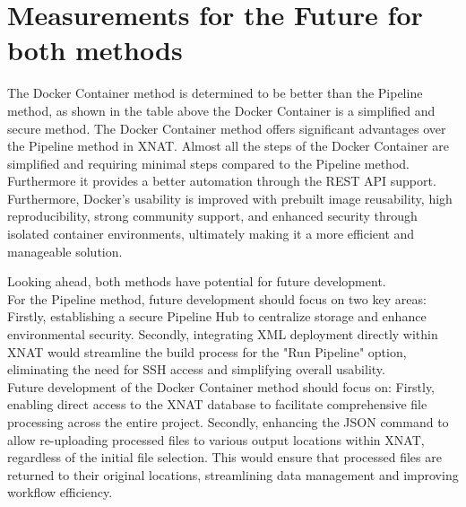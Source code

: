  
\section{Measurements for the Future for both methods}

The Docker Container method is determined to be better than the Pipeline method, as shown in the table above the Docker Container is a simplified and secure method.  
The Docker Container method offers significant advantages over the Pipeline method in XNAT.
Almost all the steps of the Docker Container are simplified and requiring minimal steps compared to the Pipeline method. Furthermore it provides a better automation through the REST API support.  Furthermore, Docker's usability is improved with prebuilt image reusability, high reproducibility, strong community support, and enhanced security through isolated container environments, ultimately making it a more efficient and manageable solution.

Looking ahead, both methods have potential for future development.\\
For the Pipeline method, future development should focus on two key areas: Firstly, establishing a secure Pipeline Hub to centralize storage and enhance environmental security. Secondly, integrating XML deployment directly within XNAT would streamline the build process for the "Run Pipeline" option, eliminating the need for SSH access and simplifying overall usability.\\
Future development of the Docker Container method should focus on: Firstly, enabling direct access to the XNAT database to facilitate comprehensive file processing across the entire project. Secondly, enhancing the JSON command to allow re-uploading processed files to various output locations within XNAT, regardless of the initial file selection. This would ensure that processed files are returned to their original locations, streamlining data management and improving workflow efficiency.

